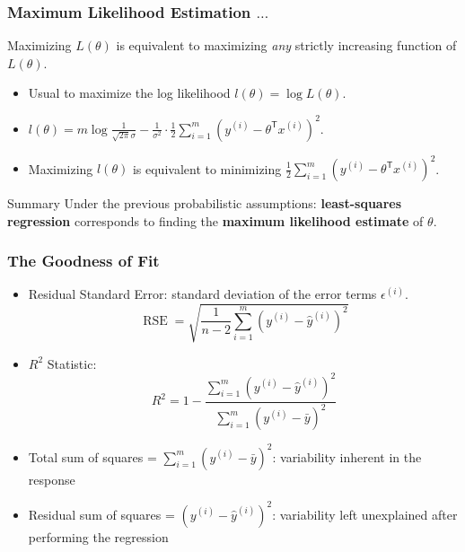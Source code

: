\documentclass[xcolor=table]{beamer}
\newcommand{\trans}[1]{\ensuremath{#1}^{\scriptscriptstyle{\textsf{T}}}}
\DeclareMathOperator{\RSE}{RSE}
\begin{document}
\begin{frame}[t]
\frametitle{Maximum Likelihood Estimation $\ldots$}
Maximizing $L(\theta)$ is equivalent to maximizing \emph{any} strictly increasing 
function of $L(\theta)$.

\pause

\begin{itemize}
    \item Usual to maximize the log likelihood $l(\theta) = \log L(\theta)$.

    \item $l(\theta) = m \log \frac{1}{\sqrt{2 \pi} \sigma} - 
                        \frac{1}{\sigma^2} \cdot \frac{1}{2} 
                            \sum_{i = 1}^{m}{\left ( y^{(i)} - \trans{\theta} x^{(i)} \right ) ^2}$.
    \item Maximizing $l(\theta)$ is equivalent to minimizing 
        $\frac{1}{2} \sum_{i = 1}^{m}{\left ( y^{(i)} - \trans{\theta} x^{(i)} \right ) ^2}$.
\end{itemize} 

\pause

\bigskip

\begin{block}{Summary}
Under the previous probabilistic assumptions: \textbf{least-squares regression} 
corresponds to finding the \textbf{maximum likelihood estimate} of $\theta$.
\end{block}
\end{frame}

\begin{frame}[t]
\frametitle{The Goodness of Fit}
\begin{itemize}
    \item Residual Standard Error: standard deviation of the error terms $\epsilon^{(i)}$.
    \[
        \RSE = \sqrt{\frac{1}{n - 2} \sum_{i = 1}^{m} \left ( y^{(i)} - \hat{y}^{(i)} \right )^2}
    \]

    \pause

    \item $R^2$ Statistic: 
    \[
        R^2 = 1 - \frac{ \sum_{i = 1}^{m} \left ( y^{(i)} - \hat{y}^{(i)} \right )^2}{ \sum_{i = 1}^{m} \left ( y^{(i)} - \bar{y} \right )^2}
    \]
\end{itemize}

\pause

\begin{itemize}
    \item Total sum of squares = $\sum_{i = 1}^{m} \left ( y^{(i)} - \bar{y} \right )^2$: variability 
        inherent in the response  
    
    \item Residual sum of squares = $\left ( y^{(i)} - \hat{y}^{(i)} \right )^2$: variability left 
        unexplained after performing the regression  
\end{itemize}
\end{frame}
\end{document}
